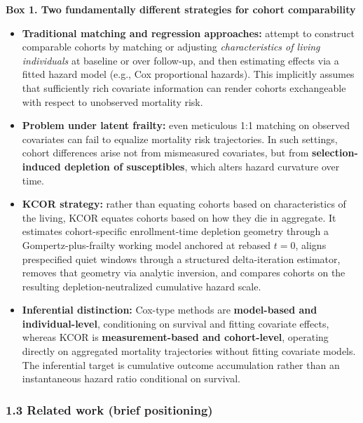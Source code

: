 \documentclass[
]{article}
\renewenvironment{quote}{\begin{mdframed}[style=kcorquote]}{\end{mdframed}}
\begin{document}
\begin{quote}
\textbf{Box 1. Two fundamentally different strategies for cohort
comparability}

\begin{itemize}
\item
  \textbf{Traditional matching and regression approaches:} attempt to
  construct comparable cohorts by matching or adjusting
  \emph{characteristics of living individuals} at baseline or over
  follow-up, and then estimating effects via a fitted hazard model
  (e.g., Cox proportional hazards). This implicitly assumes that
  sufficiently rich covariate information can render cohorts
  exchangeable with respect to unobserved mortality risk.
\item
  \textbf{Problem under latent frailty:} even meticulous 1:1 matching on
  observed covariates can fail to equalize mortality risk trajectories.
  In such settings, cohort differences arise not from mismeasured
  covariates, but from \textbf{selection-induced depletion of
  susceptibles}, which alters hazard curvature over time.
\item
  \textbf{KCOR strategy:} rather than equating cohorts based on
  characteristics of the living, KCOR equates cohorts based on how they
  die in aggregate. It estimates cohort-specific enrollment-time
  depletion geometry through a Gompertz-plus-frailty working model
  anchored at rebased \(t=0\), aligns prespecified quiet windows through
  a structured delta-iteration estimator, removes that geometry via
  analytic inversion, and compares cohorts on the resulting
  depletion-neutralized cumulative hazard scale.
\item
  \textbf{Inferential distinction:} Cox-type methods are
  \textbf{model-based and individual-level}, conditioning on survival
  and fitting covariate effects, whereas KCOR is
  \textbf{measurement-based and cohort-level}, operating directly on
  aggregated mortality trajectories without fitting covariate models.
  The inferential target is cumulative outcome accumulation rather than
  an instantaneous hazard ratio conditional on survival.
\end{itemize}
\end{quote}

\subsubsection{1.3 Related work (brief
positioning)}\label{related-work-brief-positioning}
\end{document}
